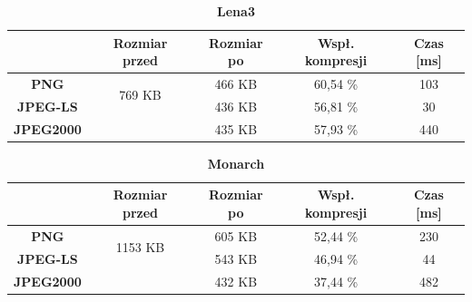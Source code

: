 \begin{table}[!h]
	\centering
	\caption{\textbf{Lena3}}
	\label{my-label}
	\begin{tabular}{|c|c|c|c|c|}                                             
		\hline
		& \textbf{Rozmiar przed} & \textbf{Rozmiar po} & \textbf{Wspł. kompresji} & \textbf{Czas {[}ms{]}} \\ \hline 
		\textbf{PNG}      &          \multicolumn{1}{c|}{\multirow{2}{*}{769 KB}}             &      466 KB               &        60,54 \%                  &         103                    \\\cline{3-5}
		\textbf{JPEG-LS}  &                        &         436 KB            &      56,81 \%                   &         30                 \\\cline{3-5}
		\textbf{JPEG2000} &                        &     435 KB             &         57,93 \%                 &       440               \\ \hline
	\end{tabular}
\end{table}

\begin{table}[!h]
	\centering
	\caption{\textbf{Monarch}}
	\label{my-label}
	\begin{tabular}{|c|c|c|c|c|}                                             
		\hline
		& \textbf{Rozmiar przed} & \textbf{Rozmiar po} & \textbf{Wspł. kompresji} & \textbf{Czas {[}ms{]}} \\ \hline 
		\textbf{PNG}      &          \multicolumn{1}{c|}{\multirow{2}{*}{1153 KB}}             &      605 KB               &          52,44 \%                &            230                 \\\cline{3-5}
		\textbf{JPEG-LS}  &                        &       543 KB             &        46,94 \%                 &        44                  \\\cline{3-5}
		\textbf{JPEG2000} &                        &      432 KB               &        37,44 \%                 &       482               \\ \hline
	\end{tabular}
\end{table}

